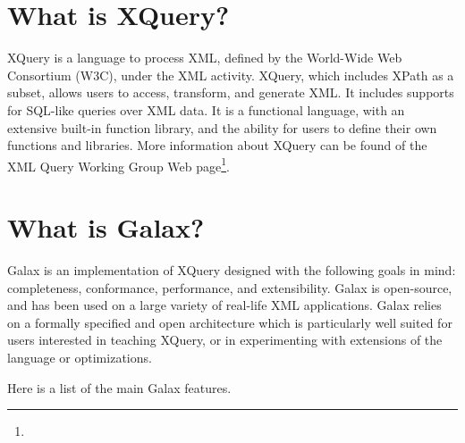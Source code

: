 \section{What is XQuery?}

XQuery is a language to process XML, defined by the World-Wide Web
Consortium (W3C), under the XML activity. XQuery, which includes XPath
as a subset, allows users to access, transform, and generate XML. It
includes supports for SQL-like queries over XML data. It is a
functional language, with an extensive built-in function library, and
the ability for users to define their own functions and libraries.
More information about XQuery can be found of the XML Query Working
Group Web page\footnote{\xquerywgurl}.

\section{What is Galax?}

Galax is an implementation of XQuery designed with the following goals
in mind: completeness, conformance, performance, and
extensibility. Galax is open-source, and has been used on a large
variety of real-life XML applications. Galax relies on a formally
specified and open architecture which is particularly well suited for
users interested in teaching XQuery, or in experimenting with
extensions of the language or optimizations.

Here is a list of the main Galax features.

